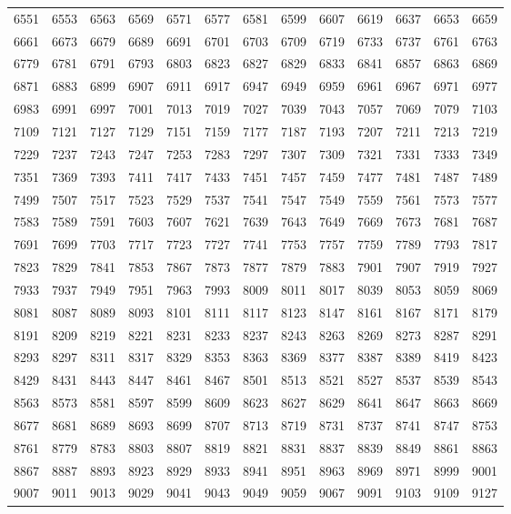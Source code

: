 \documentclass[12pt, a4paper]{article}
\begin{document}
\begin{longtable}{lllll lllll lll}
6551 &6553 &6563 &6569 &6571 &6577 &6581 &6599 &6607 &6619 &6637 &6653 &6659 \\
6661 &6673 &6679 &6689 &6691 &6701 &6703 &6709 &6719 &6733 &6737 &6761 &6763 \\
6779 &6781 &6791 &6793 &6803 &6823 &6827 &6829 &6833 &6841 &6857 &6863 &6869 \\
6871 &6883 &6899 &6907 &6911 &6917 &6947 &6949 &6959 &6961 &6967 &6971 &6977 \\
6983 &6991 &6997 &7001 &7013 &7019 &7027 &7039 &7043 &7057 &7069 &7079 &7103 \\
7109 &7121 &7127 &7129 &7151 &7159 &7177 &7187 &7193 &7207 &7211 &7213 &7219 \\
7229 &7237 &7243 &7247 &7253 &7283 &7297 &7307 &7309 &7321 &7331 &7333 &7349 \\
7351 &7369 &7393 &7411 &7417 &7433 &7451 &7457 &7459 &7477 &7481 &7487 &7489 \\
7499 &7507 &7517 &7523 &7529 &7537 &7541 &7547 &7549 &7559 &7561 &7573 &7577 \\
7583 &7589 &7591 &7603 &7607 &7621 &7639 &7643 &7649 &7669 &7673 &7681 &7687 \\
7691 &7699 &7703 &7717 &7723 &7727 &7741 &7753 &7757 &7759 &7789 &7793 &7817 \\
7823 &7829 &7841 &7853 &7867 &7873 &7877 &7879 &7883 &7901 &7907 &7919 &7927 \\
7933 &7937 &7949 &7951 &7963 &7993 &8009 &8011 &8017 &8039 &8053 &8059 &8069 \\
8081 &8087 &8089 &8093 &8101 &8111 &8117 &8123 &8147 &8161 &8167 &8171 &8179 \\
8191 &8209 &8219 &8221 &8231 &8233 &8237 &8243 &8263 &8269 &8273 &8287 &8291 \\
8293 &8297 &8311 &8317 &8329 &8353 &8363 &8369 &8377 &8387 &8389 &8419 &8423 \\
8429 &8431 &8443 &8447 &8461 &8467 &8501 &8513 &8521 &8527 &8537 &8539 &8543 \\
8563 &8573 &8581 &8597 &8599 &8609 &8623 &8627 &8629 &8641 &8647 &8663 &8669 \\
8677 &8681 &8689 &8693 &8699 &8707 &8713 &8719 &8731 &8737 &8741 &8747 &8753 \\
8761 &8779 &8783 &8803 &8807 &8819 &8821 &8831 &8837 &8839 &8849 &8861 &8863 \\
8867 &8887 &8893 &8923 &8929 &8933 &8941 &8951 &8963 &8969 &8971 &8999 &9001 \\
9007 &9011 &9013 &9029 &9041 &9043 &9049 &9059 &9067 &9091 &9103 &9109 &9127 \\

\end{longtable}
\end{document}
